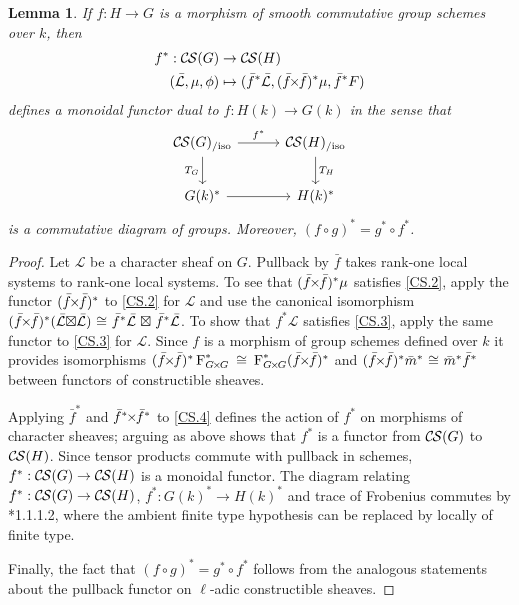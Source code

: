 \documentclass[10pt]{amsart}
\theoremstyle{plain}
\newtheorem{lemma}[theorem]{Lemma}
\theoremstyle{definition}
\theoremstyle{remark}
\newcommand{\Fq}{k}
\newcommand{\Frob}[1]{\operatorname{F}_{#1}}
\newcommand{\iso}{{\ \cong\ }}
\newcommand{\TrFrob}[1]{T_{#1}}
\newcommand{\cs}[1]{{\mathcal{#1}}}
\newcommand{\gcs}[1]{{\mathcal{\bar #1}}}
\newcommand{\CS}{{\mathcal{C\hskip-0.8pt S}}}
\newcommand{\CSiso}[1]{\CS(#1)_{/\text{iso}}}
\renewcommand{\bf}{\bar{f}}
\newcommand{\bm}{\bar{m}}
\newcommand{\tight}[3]{\hspace{-#1pt}{#2}\hspace{-#3pt}}
\newcommand{\bfxf}{\text{$\bar{f} \tight{1}{\times}{1} \bar{f}$}}
\newcommand{\GxxG}{\text{$G \tight{1}{\times}{1} G$}}
\newcommand{\LxL}{\text{$\gcs{L} \tight{0}{\boxtimes}{0} \gcs{L}$}}
\begin{document}
\begin{lemma}\label{lem:pullback}
  If $f : H\to G$ is a morphism of smooth commutative group schemes over $\Fq$, then
  \begin{align*}
  f^* : \CS(G) &\to \CS(H) \\
  (\gcs{L},\mu,\phi) &\mapsto (\bf^*\gcs{L},(\bfxf)^*\mu,\bf^*F)
  \end{align*}
  defines a monoidal functor dual to $f \colon H(\Fq) \to G(\Fq)$ in the sense that
  \[
  \begin{tikzcd}[row sep=20, column sep=30]
   \CSiso{G} \rar{f^*} \arrow[swap]{d}{\TrFrob{G}} & \CSiso{H} \dar{\TrFrob{H}} \\
   G(\Fq)^* \rar & H(\Fq)^*
  \end{tikzcd}
  \]
  is a commutative diagram of groups.  Moreover, $(f\circ g)^* = g^* \circ f^*$.
\end{lemma}
\begin{proof}
  Let $\cs{L}$ be a character sheaf on $G$. 
  Pullback by $\bf$ takes rank-one local systems to rank-one local systems.
  To see that $(\bfxf)^* \mu$ satisfies \ref{CS.2},
  apply the functor $(\bfxf)^*$
  to \ref{CS.2} for $\cs{L}$ and use the canonical isomorphism
  $(\bfxf)^*(\LxL) \iso \bf^*\gcs{L} \tight{-3}{\boxtimes}{-3} \bf^*\gcs{L}$.
  To show that $f^*\cs{L}$ satisfies
  \ref{CS.3}, apply the same functor to \ref{CS.3} for $\cs{L}$.
  Since $f$ is a morphism of group schemes defined over $\Fq$
  it provides isomorphisms $(\bfxf)^*\Frob{\GxxG}^* \iso \Frob{\GxxG}^* (\bfxf)^*$
  and $(\bfxf)^* \bm^*\iso \bm^* \bf^*$ between functors of constructible sheaves.

  Applying $\bf^*$ and $\bf^* \tight{1}{\times}{1}\bf^*$ to \ref{CS.4} defines the action
  of $f^*$ on morphisms of character sheaves; arguing as above shows that $f^*$ is
  a functor from $\CS(G)$ to $\CS(H)$.  Since tensor products commute with pullback in schemes,
  $f^* : \CS(G) \to \CS(H)$ is a monoidal functor.
  The diagram relating $f^* : \CS(G) \to \CS(H)$, $f^* : G(k)^* \to H(k)^*$ and trace of Frobenius
  commutes by \cite{laumon:87a}*{1.1.1.2}, where the ambient
 finite type hypothesis can be replaced by locally of finite type.

  Finally, the fact that $(f\circ g)^* = g^* \circ f^*$ follows from the analogous
  statements about the pullback functor on $\ell$-adic constructible sheaves.
\end{proof}
\end{document}
